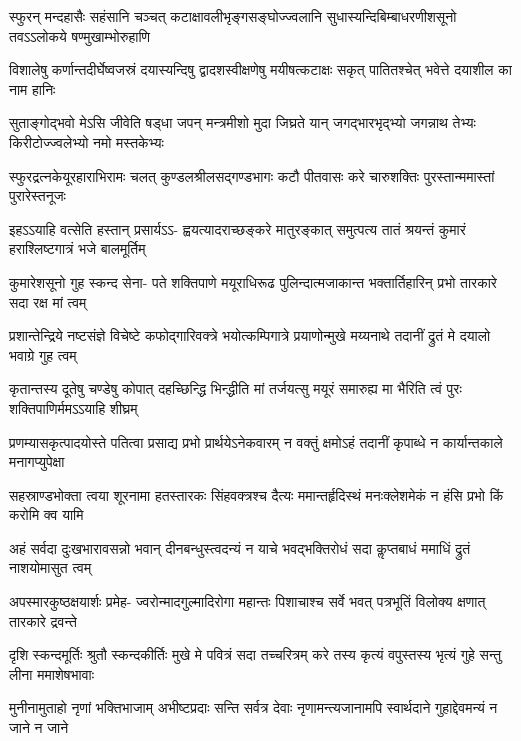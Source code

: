 \fourlineindentedshloka
{स्फुरन् मन्दहासैः सहंसानि चञ्चत्}
{कटाक्षावलीभृङ्गसङ्घोज्ज्वलानि}
{सुधास्यन्दिबिम्बाधरणीशसूनो}
{तवऽऽलोकये षण्मुखाम्भोरुहाणि}

\fourlineindentedshloka
{विशालेषु कर्णान्तदीर्घेष्वजस्रं}
{दयास्यन्दिषु द्वादशस्वीक्षणेषु}
{मयीषत्कटाक्षः सकृत् पातितश्चेत्}
{भवेत्ते दयाशील का नाम हानिः}

\fourlineindentedshloka
{सुताङ्गोद्भवो मेऽसि जीवेति षड्धा}
{जपन् मन्त्रमीशो मुदा जिघ्रते यान्}
{जगद्भारभृद्भ्यो जगन्नाथ तेभ्यः}
{किरीटोज्ज्वलेभ्यो नमो मस्तकेभ्यः}

\fourlineindentedshloka
{स्फुरद्रत्नकेयूरहाराभिरामः}
{चलत् कुण्डलश्रीलसद्गण्डभागः}
{कटौ पीतवासः करे चारुशक्तिः}
{पुरस्तान्ममास्तां पुरारेस्तनूजः}

\fourlineindentedshloka
{इहऽऽयाहि वत्सेति हस्तान् प्रसार्यऽऽ-}
{ह्वयत्यादराच्छङ्करे मातुरङ्कात्}
{समुत्पत्य तातं श्रयन्तं कुमारं}
{हराश्लिष्टगात्रं भजे बालमूर्तिम्}

\fourlineindentedshloka
{कुमारेशसूनो गुह स्कन्द सेना-}
{पते शक्तिपाणे मयूराधिरूढ}
{पुलिन्दात्मजाकान्त भक्तार्तिहारिन्}
{प्रभो तारकारे सदा रक्ष मां त्वम्}

\fourlineindentedshloka
{प्रशान्तेन्द्रिये नष्टसंज्ञे विचेष्टे}
{कफोद्गारिवक्त्रे भयोत्कम्पिगात्रे}
{प्रयाणोन्मुखे मय्यनाथे तदानीं}
{द्रुतं मे दयालो भवाग्रे गुह त्वम्}

\fourlineindentedshloka
{कृतान्तस्य दूतेषु चण्डेषु कोपात्}
{दहच्छिन्द्धि भिन्द्धीति मां तर्जयत्सु}
{मयूरं समारुह्य मा भैरिति त्वं}
{पुरः शक्तिपाणिर्ममऽऽयाहि शीघ्रम्}

\fourlineindentedshloka
{प्रणम्यासकृत्पादयोस्ते पतित्वा}
{प्रसाद्य प्रभो प्रार्थयेऽनेकवारम्}
{न वक्तुं क्षमोऽहं तदानीं कृपाब्धे}
{न कार्यान्तकाले मनागप्युपेक्षा}

\fourlineindentedshloka
{सहस्राण्डभोक्ता त्वया शूरनामा}
{हतस्तारकः सिंहवक्त्रश्च दैत्यः}
{ममान्तर्हृदिस्थं मनःक्लेशमेकं}
{न हंसि प्रभो किं करोमि क्व यामि}

\fourlineindentedshloka
{अहं सर्वदा दुःखभारावसन्नो}
{भवान् दीनबन्धुस्त्वदन्यं न याचे}
{भवद्भक्तिरोधं सदा कॢप्तबाधं}
{ममाधिं द्रुतं नाशयोमासुत त्वम्}

\fourlineindentedshloka
{अपस्मारकुष्ठक्षयार्शः प्रमेह-}
{ज्वरोन्मादगुल्मादिरोगा महान्तः}
{पिशाचाश्च सर्वे भवत् पत्रभूतिं}
{विलोक्य क्षणात् तारकारे द्रवन्ते}

\fourlineindentedshloka
{दृशि स्कन्दमूर्तिः श्रुतौ स्कन्दकीर्तिः}
{मुखे मे पवित्रं सदा तच्चरित्रम्}
{करे तस्य कृत्यं वपुस्तस्य भृत्यं}
{गुहे सन्तु लीना ममाशेषभावाः}

\fourlineindentedshloka
{मुनीनामुताहो नृणां भक्तिभाजाम्}
{अभीष्टप्रदाः सन्ति सर्वत्र देवाः}
{नृणामन्त्यजानामपि स्वार्थदाने}
{गुहाद्देवमन्यं न जाने न जाने}

